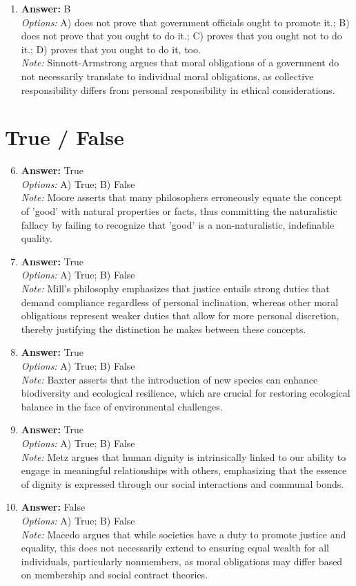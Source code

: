 \documentclass[12pt]{article}
\begin{document}
\begin{enumerate}[label=\arabic*.]
\item \textbf{Answer:} B
\\ \textit{Options:} A) does not prove that government officials ought to promote it.; B) does not prove that you ought to do it.; C) proves that you ought not to do it.; D) proves that you ought to do it, too.
\\ \textit{Note:} Sinnott-Armstrong argues that moral obligations of a government do not necessarily translate to individual moral obligations, as collective responsibility differs from personal responsibility in ethical considerations.
\end{enumerate}

\section*{True / False}
\begin{enumerate}[label=\arabic*.]
\setcounter{enumi}{5}
\item \textbf{Answer:} True
\\ \textit{Options:} A) True; B) False
\\ \textit{Note:} Moore asserts that many philosophers erroneously equate the concept of 'good' with natural properties or facts, thus committing the naturalistic fallacy by failing to recognize that 'good' is a non-naturalistic, indefinable quality.
\item \textbf{Answer:} True
\\ \textit{Options:} A) True; B) False
\\ \textit{Note:} Mill's philosophy emphasizes that justice entails strong duties that demand compliance regardless of personal inclination, whereas other moral obligations represent weaker duties that allow for more personal discretion, thereby justifying the distinction he makes between these concepts.
\item \textbf{Answer:} True
\\ \textit{Options:} A) True; B) False
\\ \textit{Note:} Baxter asserts that the introduction of new species can enhance biodiversity and ecological resilience, which are crucial for restoring ecological balance in the face of environmental challenges.
\item \textbf{Answer:} True
\\ \textit{Options:} A) True; B) False
\\ \textit{Note:} Metz argues that human dignity is intrinsically linked to our ability to engage in meaningful relationships with others, emphasizing that the essence of dignity is expressed through our social interactions and communal bonds.
\item \textbf{Answer:} False
\\ \textit{Options:} A) True; B) False
\\ \textit{Note:} Macedo argues that while societies have a duty to promote justice and equality, this does not necessarily extend to ensuring equal wealth for all individuals, particularly nonmembers, as moral obligations may differ based on membership and social contract theories.
\end{enumerate}
\end{document}
